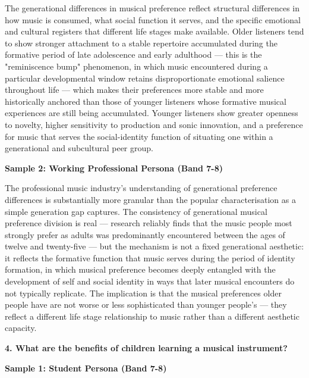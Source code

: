 The generational differences in musical preference reflect structural differences in how music is consumed, what social function it serves, and the specific emotional and cultural registers that different life stages make available. Older listeners tend to show stronger attachment to a stable repertoire accumulated during the formative period of late adolescence and early adulthood — this is the "reminiscence bump" phenomenon, in which music encountered during a particular developmental window retains disproportionate emotional salience throughout life — which makes their preferences more stable and more historically anchored than those of younger listeners whose formative musical experiences are still being accumulated. Younger listeners show greater openness to novelty, higher sensitivity to production and sonic innovation, and a preference for music that serves the social-identity function of situating one within a generational and subcultural peer group.

\textbf{Sample 2: Working Professional Persona (Band 7-8)}

The professional music industry's understanding of generational preference differences is substantially more granular than the popular characterisation as a simple generation gap captures. The consistency of generational musical preference division is real — research reliably finds that the music people most strongly prefer as adults was predominantly encountered between the ages of twelve and twenty-five — but the mechanism is not a fixed generational aesthetic: it reflects the formative function that music serves during the period of identity formation, in which musical preference becomes deeply entangled with the development of self and social identity in ways that later musical encounters do not typically replicate. The implication is that the musical preferences older people have are not worse or less sophisticated than younger people's — they reflect a different life stage relationship to music rather than a different aesthetic capacity.

\separator

\begin{ieltsquestion}
\textbf{4. What are the benefits of children learning a musical instrument?}
\end{ieltsquestion}
\textbf{Sample 1: Student Persona (Band 7-8)}

